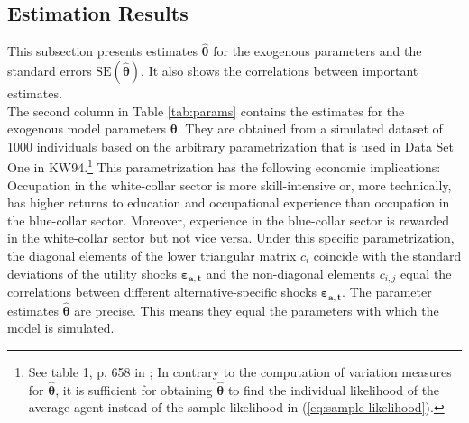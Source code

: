 \documentclass[a4paper,12pt]{article}
\begin{document}
\subsection{Estimation Results}
This subsection presents estimates $\pmb{\hat{\theta}}$ for the exogenous parameters and the standard errors $\text{SE}(\pmb{\hat{\theta}})$. It also shows the correlations between important estimates.\\
\newline
The second column in Table \ref{tab:params} contains the estimates for the exogenous model parameters $\pmb{\theta}$. They are obtained from a simulated dataset of 1000 individuals based on the arbitrary parametrization that is used in Data Set One in KW94.\footnote{See table 1, p. 658 in \cite{Keane.1994}; In contrary to the computation of variation measures for $\pmb{\hat{\theta}}$, it is sufficient for obtaining $\pmb{\hat{\theta}}$ to find the individual likelihood of the average agent instead of the sample likelihood in (\ref{eq:sample-likelihood}).}
This parametrization has the following economic implications: Occupation in the white-collar sector is more skill-intensive or, more technically, has higher returns to education and occupational experience than occupation in the blue-collar sector. Moreover, experience in the blue-collar sector is rewarded in the white-collar sector but not vice versa.
Under this specific parametrization, the diagonal elements of the lower triangular matrix $c_{i}$ coincide with the standard deviations of the utility shocks $\pmb{\varepsilon_{a,t}}$ and the non-diagonal elements $c_{i,j}$ equal the correlations between different alternative-specific shocks $\pmb{\varepsilon_{a,t}}$.
The parameter estimates $\pmb{\hat{\theta}}$ are precise. This means they equal the parameters with which the model is simulated.
\end{document}
